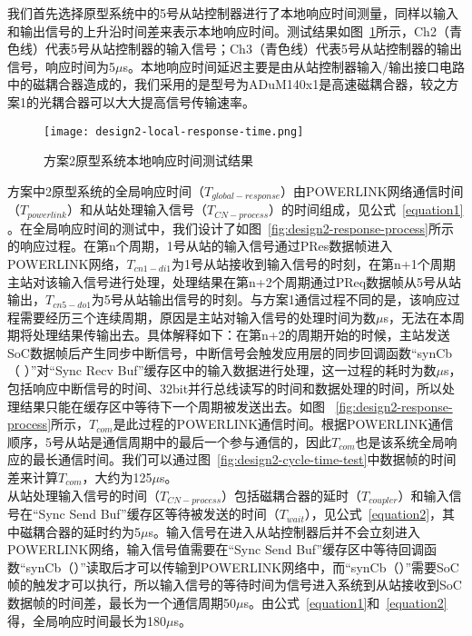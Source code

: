 我们首先选择原型系统中的5号从站控制器进行了本地响应时间测量，同样以输入和输出信号的上升沿时间差来表示本地响应时间。测试结果如图~\ref{fig:design2-local-response-time}所示，Ch2（青色线）代表5号从站控制器的输入信号；Ch3（青色线）代表5号从站控制器的输出信号，响应时间为5$\mu$s。本地响应时间延迟主要是由从站控制器输入/输出接口电路中的磁耦合器造成的，我们采用的是型号为ADuM140x1是高速磁耦合器，较之方案1的光耦合器可以大大提高信号传输速率。

\begin{figure}[!htb]
  \centering
  \texttt{[image: design2-local-response-time.png]}
  \caption{方案2原型系统本地响应时间测试结果}
  \label{fig:design2-local-response-time}
\end{figure}

方案中2原型系统的全局响应时间（$T_{global-response}$）由POWERLINK网络通信时间（$T_{powerlink}$）和从站处理输入信号（$T_{CN-process}$）的时间组成，见公式~\ref{equation1} 。在全局响应时间的测试中，我们设计了如图~\ref{fig:design2-response-process}所示的响应过程。在第n个周期，1号从站的输入信号通过PRes数据帧进入POWERLINK网络，$T_{cn1-di1}$为1号从站接收到输入信号的时刻，在第n+1个周期主站对该输入信号进行处理，处理结果在第n+2个周期通过PReq数据帧从5号从站输出，$T_{cn5-do1}$为5号从站输出信号的时刻。与方案1通信过程不同的是，该响应过程需要经历三个连续周期，原因是主站对输入信号的处理时间为数$\mu$s，无法在本周期将处理结果传输出去。具体解释如下：在第n+2的周期开始的时候，主站发送SoC数据帧后产生同步中断信号，中断信号会触发应用层的同步回调函数“synCb（ ）”对“Sync Recv Buf”缓存区中的输入数据进行处理，这一过程的耗时为数$\mu$s，包括响应中断信号的时间、32bit并行总线读写的时间和数据处理的时间，所以处理结果只能在缓存区中等待下一个周期被发送出去。如图 ~\ref{fig:design2-response-process}所示，$T_{com}$是此过程的POWERLINK通信时间。根据POWERLINK通信顺序，5号从站是通信周期中的最后一个参与通信的，因此$T_{com}$也是该系统全局响应的最长通信时间。我们可以通过图~\ref{fig:design2-cycle-time-test}中数据帧的时间差来计算$T_{com}$，大约为125$\mu$s。\\

从站处理输入信号的时间（$T_{CN-process}$）包括磁耦合器的延时（$T_{coupler}$）和输入信号在“Sync Send Buf”缓存区等待被发送的时间（$T_{wait}$），见公式~\ref{equation2}，其中磁耦合器的延时约为5$\mu$s。输入信号在进入从站控制器后并不会立刻进入POWERLINK网络，输入信号值需要在“Sync Send Buf”缓存区中等待回调函数“synCb（）”读取后才可以传输到POWERLINK网络中，而“synCb（）”需要SoC帧的触发才可以执行，所以输入信号的等待时间为信号进入系统到从站接收到SoC数据帧的时间差，最长为一个通信周期50$\mu$s。由公式~\ref{equation1}和~\ref{equation2}得，全局响应时间最长为180$\mu$s。

